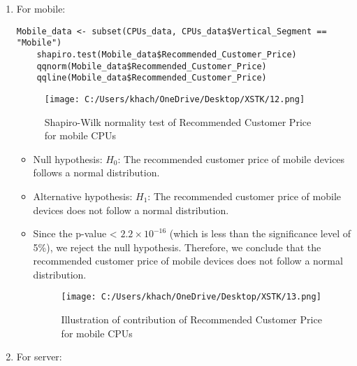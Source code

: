 \documentclass[a4paper]{article}
\begin{document}
\begin{enumerate}
\begin{itemize}
	\end{itemize}
	\newpage
		\item For mobile:
	\begin{lstlisting}[frame=single, backgroundcolor=\color{gray!10}, breaklines=true, columns=fullflexible]
	Mobile_data <- subset(CPUs_data, CPUs_data$Vertical_Segment == "Mobile")
	shapiro.test(Mobile_data$Recommended_Customer_Price)
	qqnorm(Mobile_data$Recommended_Customer_Price)
	qqline(Mobile_data$Recommended_Customer_Price)
	\end{lstlisting}
		\begin{figure}[htbp]
			\centering
			\begin{adjustbox}{width=0.7\textwidth, frame}
				\texttt{[image: C:/Users/khach/OneDrive/Desktop/XSTK/12.png]}
			\end{adjustbox}
			\captionsetup{justification=centering}
			\vspace{0.5cm}
			\caption{Shapiro-Wilk normality test of Recommended Customer Price for mobile CPUs}
		\end{figure}
		\begin{itemize}
			\item Null hypothesis:
			\( H_0 \): The recommended customer price of mobile devices follows a normal distribution.
			\item Alternative hypothesis:
			\( H_1 \): The recommended customer price of mobile devices does not follow a normal distribution.
			\item Since the p-value < \(2.2 \times 10^{-16}\) (which is less than the significance level of 5\%), we reject the null hypothesis. Therefore, we conclude that the recommended customer price of mobile devices does not follow a normal distribution.
			\begin{figure}[htbp]
				\centering
				\begin{adjustbox}{width=0.7\textwidth, frame}
					\texttt{[image: C:/Users/khach/OneDrive/Desktop/XSTK/13.png]}
				\end{adjustbox}
				\captionsetup{justification=centering}
				\vspace{0.5cm}
				\caption{Illustration of contribution of Recommended Customer Price for mobile CPUs}
			\end{figure}
		\end{itemize}
		\newpage
		\item For server:
	\begin{lstlisting}[frame=single, backgroundcolor=\color{gray!10}, breaklines=true, columns=fullflexible]

\end{lstlisting}
\end{enumerate}
\end{document}
